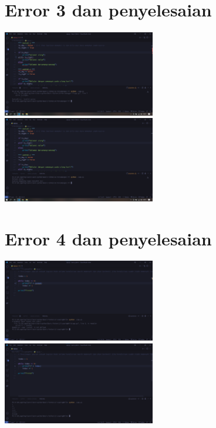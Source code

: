 \documentclass{article}
\begin{document}
\section{Error 3 dan penyelesaian}
\includegraphics[width=0.5\textwidth]{gambar/11_error.png}
\includegraphics[width=0.5\textwidth]{gambar/11_penanganan.png}

\section{Error 4 dan penyelesaian}
\includegraphics[width=0.5\textwidth]{gambar/13_error.png}
\includegraphics[width=0.5\textwidth]{gambar/13_penanganan.png}
\end{document}
